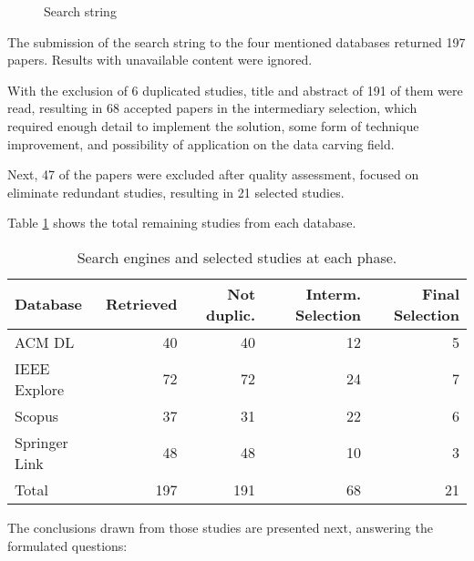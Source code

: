 \begin{figure}[!ht]
  \centering
  \caption{Search string}
  \label{fig:searchstring}
\end{figure}
	
The submission of the search string to the four mentioned databases returned 197 papers.
Results with unavailable content were ignored.

With the exclusion of 6 duplicated studies, title and abstract of 191 of them were read, resulting in 68 accepted papers in the intermediary selection, which required enough detail to implement the solution, some form of technique improvement, and possibility of application on the data carving field.

Next, 47 of the papers were excluded after quality assessment, focused on eliminate redundant studies, resulting in 21 selected studies.

Table 
\ref{tab:results}
shows the total remaining studies from each database.


\begin{table}[h]
    \begin{tabular}{l r r r r}
    \hline
    Database &        Retrieved & 
                                Not duplic. & 
                                         Interm. Selection & 
                                               Final Selection\\
    \hline
    ACM	DL			& 40 &      40 &     12  & 5 \\
    IEEE Explore	& 72 &      72 &     24  & 7 \\
    Scopus			& 37 &      31 &     22  & 6 \\
    Springer Link	& 48 &      48 &     10  & 3 \\
    \hline
    Total           & 197 &    191 &     68  & 21 \\
    \hline
    
    \end{tabular}
    \caption{Search engines and selected studies at each phase.}\label{tab:results}
\end{table}

The conclusions drawn from those studies are presented next, answering the formulated questions:

